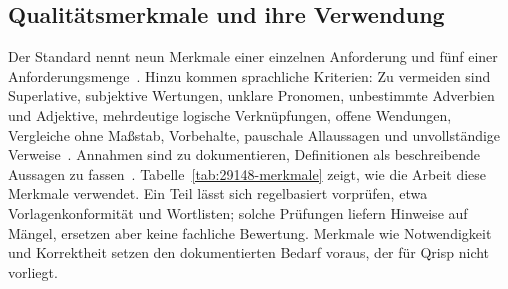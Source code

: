 \documentclass[11pt,a4paper]{report}
\begin{document}
\subsection{Qualitätsmerkmale und ihre Verwendung}
\label{subsec:merkmale-einzeln}
\label{subsec:merkmale-menge}
\label{subsec:sprachkriterien}

Der Standard nennt neun Merkmale einer einzelnen Anforderung und fünf
einer Anforderungsmenge~\cite[Abschn.~5.2.5 und 5.2.6]{iso29148}.
Hinzu kommen sprachliche Kriterien: Zu vermeiden sind Superlative,
subjektive Wertungen, unklare Pronomen, unbestimmte Adverbien und
Adjektive, mehrdeutige logische Verknüpfungen, offene Wendungen,
Vergleiche ohne Maßstab, Vorbehalte, pauschale Allaussagen und
unvollständige Verweise~\cite[Abschn.~5.2.7]{iso29148}. Annahmen sind
zu dokumentieren, Definitionen als beschreibende Aussagen zu
fassen~\cite[Abschn.~5.2.7--5.2.8]{iso29148}.
Tabelle~\ref{tab:29148-merkmale} zeigt, wie die Arbeit diese Merkmale
verwendet. Ein Teil lässt sich regelbasiert vorprüfen, etwa
Vorlagenkonformität und Wortlisten; solche Prüfungen liefern Hinweise
auf Mängel, ersetzen aber keine fachliche Bewertung. Merkmale wie
Notwendigkeit und Korrektheit setzen den dokumentierten Bedarf voraus,
der für Qrisp nicht vorliegt.
\end{document}
